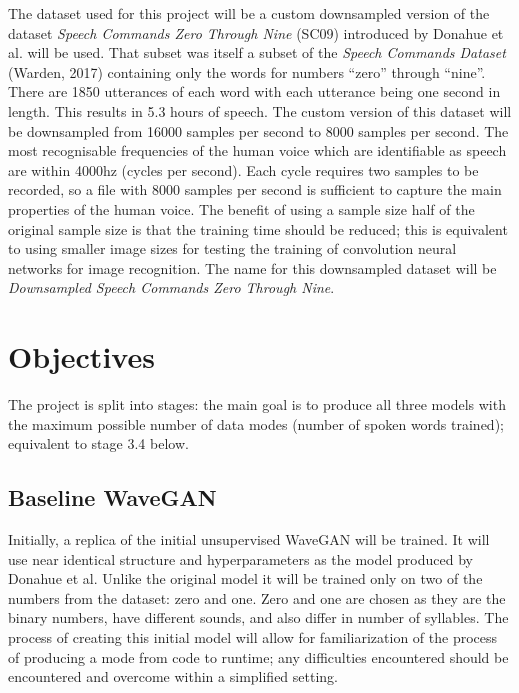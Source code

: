 \documentclass{article}
\begin{document}
The dataset used for this project will be a custom downsampled version of the dataset \textit{Speech Commands Zero Through Nine} (SC09) introduced by Donahue et al. will be used.
That subset was itself a subset of the \textit{Speech Commands Dataset} (Warden, 2017) containing only the words for numbers ``zero'' through ``nine''.
There are 1850 utterances of each word with each utterance being one second in length.
This results in 5.3 hours of speech.
\newline
\newline
The custom version of this dataset will be downsampled from 16000 samples per second to 8000 samples per second.
The most recognisable frequencies of the human voice which are identifiable as speech are within 4000hz (cycles per second).
Each cycle requires two samples to be recorded, so a file with 8000 samples per second is sufficient to capture the main properties of the human voice.
The benefit of using a sample size half of the original sample size is that the training time should be reduced; this is equivalent to using smaller image sizes for testing the training of convolution neural networks for image recognition.
\newline
\newline
The name for this downsampled dataset will be \textit{Downsampled Speech Commands Zero Through Nine}.

\section{Objectives}

The project is split into stages: the main goal is to produce all three models with the maximum possible number of data modes (number of spoken words trained); equivalent to stage 3.4 below.

\subsection{Baseline WaveGAN}

Initially, a replica of the initial unsupervised WaveGAN will be trained.
It will use near identical structure and hyperparameters as the model produced by Donahue et al.
Unlike the original model it will be trained only on two of the numbers from the dataset: zero and one.
Zero and one are chosen as they are the binary numbers, have different sounds, and also differ in number of syllables.
\newline
\newline
The process of creating this initial model will allow for familiarization of the process of producing a mode from code to runtime; any difficulties encountered should be encountered and overcome within a simplified setting. 
\end{document}
